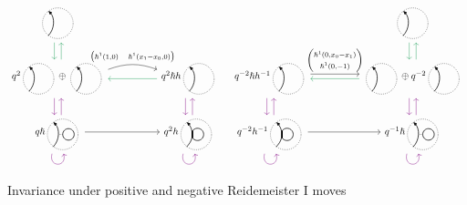 \documentclass{article}
\theoremstyle{plain} %
\theoremstyle{definition} %
\theoremstyle{remark} %
\begin{document}
\begin{figure}
	\centering
	\[\label{r1}
	\begin{tikzcd}[column sep=1.8cm, ampersand replacement=\&]
		\scalebox{0.7}{\SingleEdge{}{}}  
		\arrow[d, color=ForestGreen, shift right=1.5] 
		\& \\
		q^2\scalebox{0.7}{\SingleEdge{}{}}\oplus \scalebox{0.7}{\SingleEdge{}{}}  
		\arrow[u, color=ForestGreen, shift right=1.5] 
		\arrow[d, color=violet, shift right=1.5] 
		\arrow[r, "{\begin{pmatrix}\hslash^1(1,0) & \hslash^1(x_1-x_0,0) \end{pmatrix}}", shift left=3, bend left=20, start anchor=east, end anchor=west]
		\&
		q^2\hslash h\scalebox{0.7}{\SingleEdge{}{}} 
		\arrow[d, color=violet, shift right=1.5]
		\arrow[l, color=ForestGreen, shift left=1]
		\\
		q \hslash \scalebox{0.7}{\ThinEdgeAndCircle{}{}{}} \arrow[r]
		\arrow[u, color=violet, shift right=1.5] 
		\arrow[loop right, distance=1.5em, in=-75, out=-105, color=violet]
		\&
		q^2 h\scalebox{0.7}{\ThickEdgeAndCircle{}{}{}} 
		\arrow[u, color=violet, shift right=1.5] 
		\arrow[loop right, distance=1.5em, in=-75, out=-105, color=violet] 
	\end{tikzcd} 
	\quad
	\begin{tikzcd}[column sep=1.8cm]
		& 
		\scalebox{0.7}{\SingleEdge{}{}}  
		\arrow[d, color=ForestGreen, shift right=1.5] 
		\\
		q^{-2}\hslash h^{-1}\scalebox{0.7}{\SingleEdge{}{}}   \arrow[d, color=violet, shift right=1.5] 
		\ar[r, "{\begin{pmatrix}\hslash^1(0,x_0-x_1) \\\hslash^1(0,-1)
		\end{pmatrix}}", shift left=1] 
		&
		\scalebox{0.7}{\SingleEdge{}{}}\oplus q^{-2}\scalebox{0.7}{\SingleEdge{}{}} 
		\arrow[d, color=violet, shift right=1.5]
		\arrow[u, color=ForestGreen, shift right=1.5] 
		\ar[l, color=ForestGreen, shift left=1] 
		\\
		q^{-2} h^{-1}\scalebox{0.7}{\ThickEdgeAndCircle{}{}{}} 
		\ar[r] 
		\arrow[u, color=violet, shift right=1.5] 
		\arrow[loop right, distance=1.5em, in=-75, out=-105, color=violet] 
		&
		q^{-1}\hslash \scalebox{0.7}{\ThinEdgeAndCircle{}{}{}} 
		\arrow[u, color=violet, shift right=1.5] 
		\arrow[loop right, distance=1.5em, in=-75, out=-105, color=violet]
	\end{tikzcd}
	\]
	\caption{Invariance under positive and negative Reidemeister I moves}
	\label{fig:R1}
\end{figure}
\end{document}
